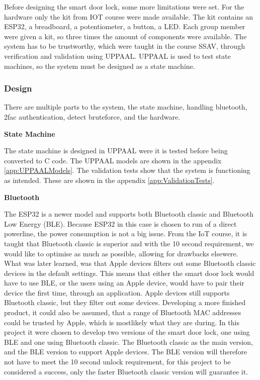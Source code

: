 
Before designing the smart door lock, some more limitations were set.
For the hardware only the kit from IOT course were made available.
The kit contains an ESP32, a breadboard, a potentiometer, a button, a LED.
Each group member were given a kit, so three times the amount of components were available.
The system has to be trustworthy, which were taught in the course SSAV, through verification and validation using UPPAAL.
UPPAAL is used to test state machines, so the system must be designed as a state machine.

\subsubsection{Design}

There are multiple parts to the system, the state machine, handling bluetooth, 2fac authentication, detect bruteforce, and the hardware.

\textbf{State Machine}

The state machine is designed in UPPAAL were it is tested before being converted to C code.
The UPPAAL models are shown in the appendix \ref{app:UPPAALModels}.
The validation tests show that the system is functioning as intended.
These are shown in the appendix \ref{app:ValidationTests}.

\textbf{Bluetooth}

The ESP32 is a newer model and supports both Bluetooth classic and Bluetooth Low Energy (BLE).
Because ESP32 in this case is chosen to run of a direct powerline, the power consumption is not a big issue.
From the IoT course, it is taught that Bluetooth classic is superior and with the 10 second requirement, we would like to optimise as much as possible, allowing for drawbacks elsewere.
What was later learned, was that Apple devices filters out some Bluetooth classic devices in the default settings.
This means that either the smart door lock would have to use BLE, or the users using an Apple device, would have to pair their device the first time, through an application.
Apple devices still supports Bluetooth classic, but they filter out some devices.
Developing a more finished product, it could also be assumed, that a range of Bluetooth MAC addresses could be trusted by Apple, which is mostlikely what they are during.
In this project it were chosen to develop two versions of the smart door lock, one using BLE and one using Bluetooth classic.
The Bluetooth classic as the main version, and the BLE version to support Apple devices.
The BLE version will therefore not have to meet the 10 second unlock requirement, for this project to be considered a success, only the faster Bluetooth classic version will guarantee it.

